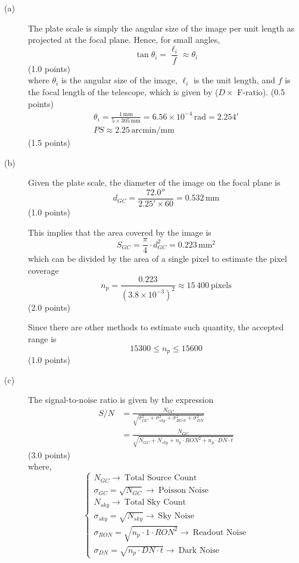 \begin{description}
\item[(a)] The plate scale is simply the angular size of the image per unit
length as projected at the focal plane. Hence, for small angles,
\[ \tan\theta_i = \frac{\ell_i}{f} \approx \theta_i \]
\hfill(1.0 points)\\
where $\theta_i$ is the angular size of the image, $\ell_i$ is the unit
length, and $f$ is the focal length of the telescope, which is given by
($D \times$ F-ratio). \hfill(0.5 points)
\begin{gather*}
\theta_i = \frac{1\,\mathrm{mm}}{5 \times 305\,\mathrm{mm}}
  = 6.56 \times 10^{-4}\,\mathrm{rad} = 2.254' \\
PS \approx 2.25\,\mathrm{arcmin/mm}
\end{gather*}
\hfill(1.5 points)

\item[(b)] Given the plate scale, the diameter of the image on the focal
plane is
\[ d_{GC} = \frac{72.0''}{2.25' \times 60} = 0.532\,\mathrm{mm} \]
\hfill(1.0 points)

This implies that the area covered by the image is
\[ S_{GC} = \frac{\pi}{4} \cdot d_{GC}^2 = 0.223\,\mathrm{mm}^2 \]
which can be divided by the area of a single pixel to estimate the pixel
coverage
\[ n_p = \frac{0.223}{(3.8 \times 10^{-3})^2}
   \approx 15\,400~\text{pixels} \]
\hfill(2.0 points)

Since there are other methods to estimate such quantity, the accepted range
is
\[ 15300 \leqslant n_p \leqslant 15600 \]
\hfill(1.0 points)

\item[(c)] The signal-to-noise ratio is given by the expression
\begin{align*}
S/N &= \frac{N_{GC}}
  {\sqrt{\sigma_{GC}^2 + \sigma_{sky}^2 + \sigma_{RON}^2 + \sigma_{DN}^2}} \\
  &= \frac{N_{GC}}
  {\sqrt{N_{GC} + N_{sky} + n_p \cdot RON^2 + n_p \cdot DN \cdot t}}
\end{align*}
\hfill(3.0 points)\\
where,
\[
\begin{cases}
N_{GC} \rightarrow~\text{Total Source Count} \\
\sigma_{GC} = \sqrt{N_{GC}} \rightarrow~\text{Poisson Noise} \\
N_{sky} \rightarrow~\text{Total Sky Count} \\
\sigma_{sky} = \sqrt{N_{sky}} \rightarrow~\text{Sky Noise} \\
\sigma_{RON} = \sqrt{n_p \cdot 1 \cdot RON^2}
  \rightarrow~\text{Readout Noise} \\
\sigma_{DN} = \sqrt{n_p \cdot DN \cdot t} \rightarrow~\text{Dark Noise}
\end{cases}
\]


\end{description}

